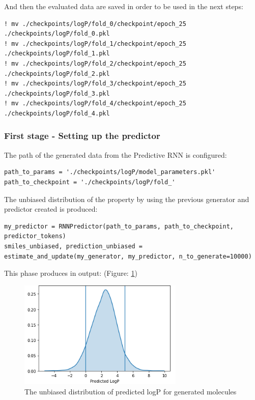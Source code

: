 \documentclass[a4paper]{article}
\begin{document}
And then the evaluated data are saved in order to be used in the next steps:

\begin{lstlisting}
! mv ./checkpoints/logP/fold_0/checkpoint/epoch_25 ./checkpoints/logP/fold_0.pkl
! mv ./checkpoints/logP/fold_1/checkpoint/epoch_25 ./checkpoints/logP/fold_1.pkl
! mv ./checkpoints/logP/fold_2/checkpoint/epoch_25 ./checkpoints/logP/fold_2.pkl
! mv ./checkpoints/logP/fold_3/checkpoint/epoch_25 ./checkpoints/logP/fold_3.pkl
! mv ./checkpoints/logP/fold_4/checkpoint/epoch_25 ./checkpoints/logP/fold_4.pkl
\end{lstlisting}

\subsubsection{First stage - Setting up the predictor}\label{sec:First stage - Setting up the predictor}

The path of the generated data from the Predictive RNN is configured:

\begin{lstlisting}
path_to_params = './checkpoints/logP/model_parameters.pkl'
path_to_checkpoint = './checkpoints/logP/fold_'
\end{lstlisting}

The unbiased distribution of the property by using the previous generator and predictor created is produced:

\begin{lstlisting}
my_predictor = RNNPredictor(path_to_params, path_to_checkpoint, predictor_tokens)
smiles_unbiased, prediction_unbiased = estimate_and_update(my_generator, my_predictor, n_to_generate=10000)
\end{lstlisting}

This phase produces in output: (Figure: \ref{fig:unbiased})

\begin{figure}[htbp]
    \centering
        \includegraphics[width=0.70\textwidth]{unbiased.png}
    \caption{The unbiased distribution of predicted logP for generated molecules}
    \label{fig:unbiased}
\end{figure}
\end{document}
